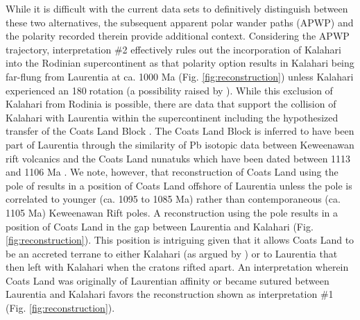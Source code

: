 \documentclass[11pt,letterpaper]{article}
\begin{document}
While it is difficult with the current data sets to definitively distinguish between these two alternatives, the subsequent apparent polar wander paths (APWP) and the polarity recorded therein provide additional context. Considering the APWP trajectory, interpretation $\#$2 effectively rules out the incorporation of Kalahari into the Rodinian supercontinent as that polarity option results in Kalahari being far-flung from Laurentia at ca. 1000 Ma (Fig. \ref{fig:reconstruction}) unless Kalahari experienced an 180\textdegree$\;$rotation (a possibility raised by \citealt{Jacobs2008a}). While this exclusion of Kalahari from Rodinia is possible, there are data that support the collision of Kalahari with Laurentia within the supercontinent including the hypothesized transfer of the Coats Land Block \citep{Loewy2011a}. The Coats Land Block is inferred to have been part of Laurentia through the similarity of Pb isotopic data between Keweenawan rift volcanics and the Coats Land nunatuks \citep{Loewy2011a} which have been dated between 1113 and 1106 Ma \citep{Gose1997a}. We note, however, that reconstruction of Coats Land using the pole of \cite{Gose1997a} results in a position of Coats Land offshore of Laurentia unless the pole is correlated to younger (ca. 1095 to 1085 Ma) rather than contemporaneous (ca. 1105 Ma) Keweenawan Rift poles. A reconstruction using the \cite{Gose1997a} pole results in a position of Coats Land in the gap between Laurentia and Kalahari (Fig. \ref{fig:reconstruction}). This position is intriguing given that it allows Coats Land to be an accreted terrane to either Kalahari (as argued by \cite{Dalziel2000a}) or to Laurentia that then left with Kalahari when the cratons rifted apart. An interpretation wherein Coats Land was originally of Laurentian affinity or became sutured between Laurentia and Kalahari favors the reconstruction shown as interpretation $\#$1 (Fig. \ref{fig:reconstruction}).
\end{document}
